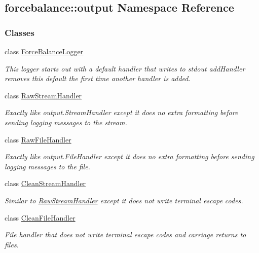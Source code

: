 \hypertarget{namespaceforcebalance_1_1output}{\subsection{forcebalance\-:\-:output \-Namespace \-Reference}
\label{namespaceforcebalance_1_1output}
}
\subsubsection*{\-Classes}
\begin{DoxyCompactItemize}
\item 
class \hyperlink{classforcebalance_1_1output_1_1ForceBalanceLogger}{\-Force\-Balance\-Logger}
\begin{DoxyCompactList}\small\item\em \-This logger starts out with a default handler that writes to stdout add\-Handler removes this default the first time another handler is added. \end{DoxyCompactList}\item 
class \hyperlink{classforcebalance_1_1output_1_1RawStreamHandler}{\-Raw\-Stream\-Handler}
\begin{DoxyCompactList}\small\item\em \-Exactly like output.\-Stream\-Handler except it does no extra formatting before sending logging messages to the stream. \end{DoxyCompactList}\item 
class \hyperlink{classforcebalance_1_1output_1_1RawFileHandler}{\-Raw\-File\-Handler}
\begin{DoxyCompactList}\small\item\em \-Exactly like output.\-File\-Handler except it does no extra formatting before sending logging messages to the file. \end{DoxyCompactList}\item 
class \hyperlink{classforcebalance_1_1output_1_1CleanStreamHandler}{\-Clean\-Stream\-Handler}
\begin{DoxyCompactList}\small\item\em \-Similar to \hyperlink{classforcebalance_1_1output_1_1RawStreamHandler}{\-Raw\-Stream\-Handler} except it does not write terminal escape codes. \end{DoxyCompactList}\item 
class \hyperlink{classforcebalance_1_1output_1_1CleanFileHandler}{\-Clean\-File\-Handler}
\begin{DoxyCompactList}\small\item\em \-File handler that does not write terminal escape codes and carriage returns to files. \end{DoxyCompactList}\end{DoxyCompactItemize}
